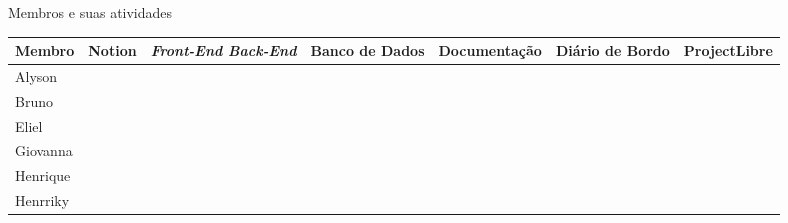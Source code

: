 \begin{quadro}[h]
	\setlength{\tabcolsep}{2pt}
	\begin{center}
		\caption{\label{quad:membros-atividades}Membros e suas atividades}
		\begin{tabular}{|l|c|m{2.5cm}|m{2cm}|c|m{2cm}|c|}
			\hline
			\textbf{Membro} & \textbf{Notion} & \centering\textbf{\textit{Front-End Back-End}} & \centering\textbf{Banco de Dados} & \textbf{Documentação} & \centering\textbf{Diário de Bordo} & \textbf{ProjectLibre}\\
			\hline
			Alyson & \checkmark & \centering\checkmark & \centering\checkmark & \checkmark & \centering\checkmark & \checkmark \\
			\hline
			Bruno & \checkmark & \centering\checkmark & \centering\checkmark & \checkmark & & \checkmark\\
			\hline
			Eliel & \checkmark & \centering\checkmark & \centering\checkmark & \checkmark & & \checkmark\\
			\hline
			Giovanna & \checkmark &  & \centering\checkmark & \checkmark & \centering\checkmark & \checkmark\\
			\hline
			Henrique & \checkmark & \centering\checkmark & \centering\checkmark & \checkmark & & \\
			\hline
			Henrriky & \checkmark & \centering\checkmark & \centering\checkmark & \checkmark & & \\
			\hline
		\end{tabular}
	\end{center}
\end{quadro}